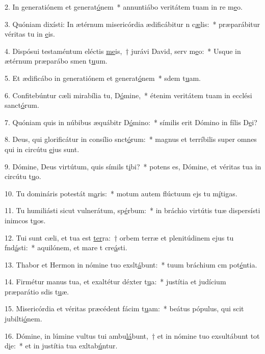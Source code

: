 2. In generatiónem et generat\uline{ó}nem~* annuntiábo veritátem tuam in re m\uline{e}o.\par 
3. Quóniam dixísti: In ætérnum misericórdia ædificábitur n c\uline{æ}lis:~* præparábitur véritas tu in \uline{e}is.\par 
4. Dispósui testaméntum eléctis \uline{me}is,~† jurávi David, serv m\uline{e}o:~* Usque in ætérnum præparábo smen t\uline{u}um.\par 
5. Et ædificábo in generatiónem et generat\uline{ó}nem~* sdem t\uline{u}am.\par 
6. Confitebúntur cæli mirabília tu, D\uline{ó}mine,~* étenim veritátem tuam in ecclési sanct\uline{ó}rum.\par 
7. Quóniam quis in núbibus æquábitr D\uline{ó}mino:~* símilis erit Dómino in fílis D\uline{e}i?\par 
8. Deus, qui glorificátur in consílio snct\uline{ó}rum:~* magnus et terríbilis super omnes qui in circútu \uline{e}jus sunt.\par 
9. Dómine, Deus virtútum, quis símils t\uline{i}bi?~* potens es, Dómine, et véritas tua in circútu t\uline{u}o.\par 
10. Tu domináris potestát m\uline{a}ris:~* motum autem flúctuum ejs tu m\uline{í}tigas.\par 
11. Tu humiliásti sicut vulnerátum, sp\uline{é}rbum:~* in bráchio virtútis tuæ dispersísti inimcos t\uline{u}os.\par 
12. Tui sunt cæli, et tua est \uline{ter}ra:~† orbem terræ et plenitúdinem ejus tu fnd\uline{á}sti:~* aquilónem, et mare t cre\uline{á}sti.\par 
13. Thabor et Hermon in nómine tuo exslt\uline{á}bunt:~* tuum bráchium cm pot\uline{é}ntia.\par 
14. Firmétur manus tua, et exaltétur déxter t\uline{u}a:~* justítia et judícium præparátio sdis t\uline{u}æ.\par 
15. Misericórdia et véritas præcédent fácim t\uline{u}am:~* beátus pópulus, qui scit jubilti\uline{ó}nem.\par 
16. Dómine, in lúmine vultus tui ambu\uline{lá}bunt,~† et in nómine tuo exsultábunt tot d\uline{i}e:~* et in justítia tua exltab\uline{ú}ntur.\par 
